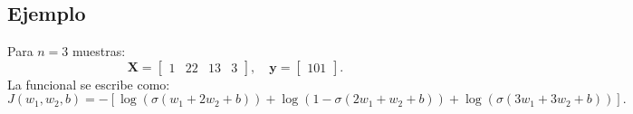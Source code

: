 \documentclass[12pt]{book}
\theoremstyle{definition}
\theoremstyle{plain}
\theoremstyle{remark}
\begin{document}
\subsection{Ejemplo}
Para $ n = 3 $ muestras:
$$
\mathbf{X} = \begin{bmatrix} 1 & 2  2 & 1  3 & 3 \end{bmatrix}, \quad \mathbf{y} = \begin{bmatrix} 1  0  1 \end{bmatrix}.
$$
La funcional se escribe como: \scriptsize
$$
J(w_1, w_2, b) = -\left[ \log(\sigma(w_1 + 2w_2 + b)) + \log(1 - \sigma(2w_1 + w_2 + b)) + \log(\sigma(3w_1 + 3w_2 + b)) \right].
$$
\normalsize




%
%




{\footnotesize


}

{\scriptsize \printindex}
\end{document}
